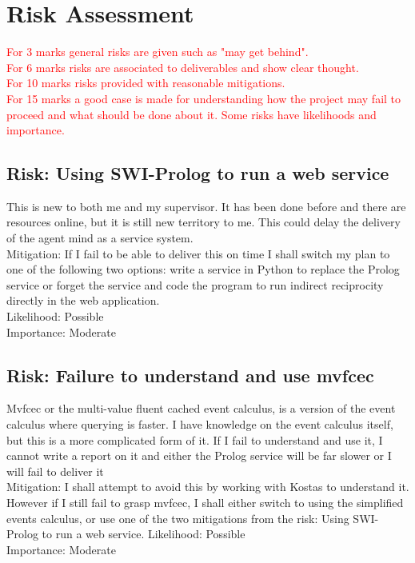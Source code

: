 \documentclass{article}
\begin{document}
\section*{Risk Assessment}

\textcolor{red}{For 3 marks general risks are given such as "may get behind".\\For 6 marks risks are associated to deliverables and show clear thought.\\For 10 marks risks provided with reasonable mitigations.\\For 15 marks a good case is made for understanding how the project may fail to proceed and what should be done about it. Some risks have likelihoods and importance.}

\subsection*{Risk: Using SWI-Prolog to run a web service}
This is new to both me and my supervisor. It has been done before and there are resources online, but it is still new territory to me. This could delay the delivery of the agent mind as a service system.\\
Mitigation: If I fail to be able to deliver this on time I shall switch my plan to one of the following two options: write a service in Python to replace the Prolog service or forget the service and code the program to run indirect reciprocity directly in the web application.\\
Likelihood: Possible\\
Importance: Moderate

\subsection*{Risk: Failure to understand and use mvfcec}
Mvfcec or the multi-value fluent cached event calculus, is a version of the event calculus where querying is faster. I have knowledge on the event calculus itself, but this is a more complicated form of it. If I fail to understand and use it, I cannot write a report on it and either the Prolog service will be far slower or I will fail to deliver it\\
Mitigation: I shall attempt to avoid this by working with Kostas to understand it. However if I still fail to grasp mvfcec, I shall either switch to using the simplified events calculus, or use one of the two mitigations from the risk: Using SWI-Prolog to run a web service.
Likelihood: Possible\\
Importance: Moderate
\end{document}
